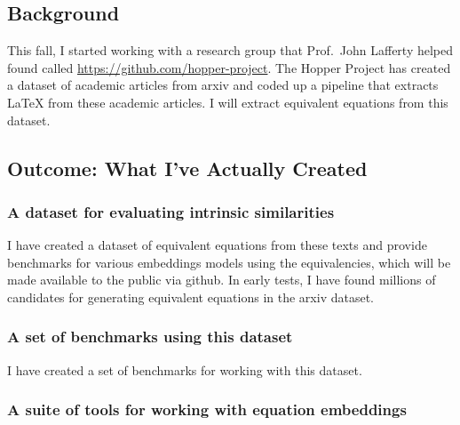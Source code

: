 \documentclass[]{article}
\begin{document}
\hypertarget{background}{%
\subsection{Background}\label{background}}

This fall, I started working with a research group that Prof.~John
Lafferty helped found called
\href{The\%20Hopper\%20Project}{https://github.com/hopper-project}. The
Hopper Project has created a dataset of academic articles from arxiv and
coded up a pipeline that extracts LaTeX from these academic articles. I
will extract equivalent equations from this dataset.

\hypertarget{outcome-what-ive-actually-created}{%
\subsection{Outcome: What I've Actually
Created}\label{outcome-what-ive-actually-created}}

\hypertarget{a-dataset-for-evaluating-intrinsic-similarities}{%
\subsubsection{A dataset for evaluating intrinsic
similarities}\label{a-dataset-for-evaluating-intrinsic-similarities}}

I have created a dataset of equivalent equations from these texts and
provide benchmarks for various embeddings models using the
equivalencies, which will be made available to the public via github. In
early tests, I have found millions of candidates for generating
equivalent equations in the arxiv dataset.

\hypertarget{a-set-of-benchmarks-using-this-dataset}{%
\subsubsection{A set of benchmarks using this
dataset}\label{a-set-of-benchmarks-using-this-dataset}}

I have created a set of benchmarks for working with this dataset.

\hypertarget{a-suite-of-tools-for-working-with-equation-embeddings}{%
\subsubsection{A suite of tools for working with equation
embeddings}\label{a-suite-of-tools-for-working-with-equation-embeddings}}
\end{document}
